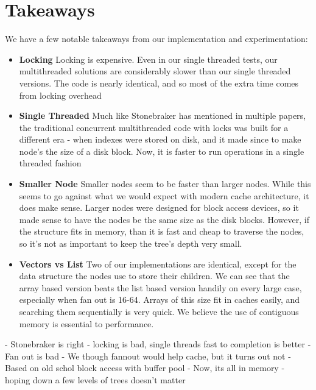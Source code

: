 \documentclass{sig-alternate}
\begin{document}
\section{Takeaways}
We have a few notable takeaways from our implementation and experimentation:
\begin{itemize}
\item \textbf{Locking} Locking is expensive.  Even in our single threaded tests, our multithreaded solutions are considerably slower than our single threaded versions.  The code is nearly identical, and so most of the extra time comes from locking overhead
\item \textbf{Single Threaded} Much like Stonebraker has mentioned in multiple papers, the traditional concurrent multithreaded code with locks was built for a different era - when indexes were stored on disk, and it made since to make node's the size of a disk block.  Now, it is faster to run operations in a single threaded fashion
\item \textbf{Smaller Node} Smaller nodes seem to be faster than larger nodes.  While this seems to go against what we would expect with modern cache architecture, it does make sense.  Larger nodes were designed for block access devices, so it made sense to have the nodes be the same size as the disk blocks.  However, if the structure fits in memory, than it is fast and cheap to traverse the nodes, so it's not as important to keep the tree's depth very small.
\item \textbf{Vectors vs List} Two of our implementations are identical, except for the data structure the nodes use to store their children.  We can see that the array based version beats the list based version handily on every large case, especially when fan out is 16-64.  Arrays of this size fit in caches easily, and searching them sequentially is very quick.  We believe the use of contiguous memory is essential to performance.
\end{itemize}
- Stonebraker is right - locking is bad, single threads fast to completion is better
- Fan out is bad
	- We though fannout would help cache, but it turns out not
	- Based on old schol block access with buffer pool
	- Now, its all in memory - hoping down a few levels of trees doesn't matter
\end{document}
